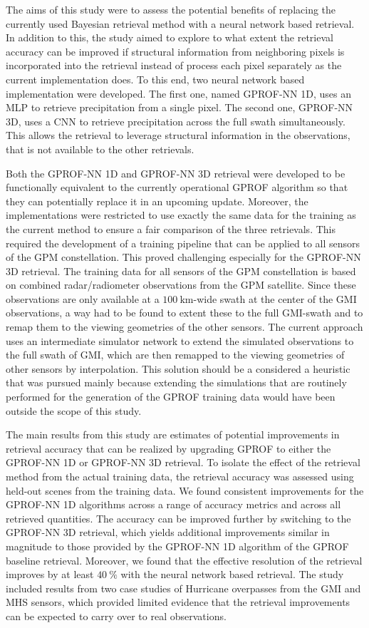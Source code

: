 The aims of this study were to assess the potential benefits of replacing the
currently used Bayesian retrieval method with a neural network based retrieval.
In addition to this, the study aimed to explore to what extent the retrieval
accuracy can be improved if structural information from neighboring pixels is
incorporated into the retrieval instead of process each pixel separately as the
current implementation does. To this end, two neural network based
implementation were developed. The first one, named GPROF-NN 1D, uses an MLP to
retrieve precipitation from a single pixel. The second one, GPROF-NN 3D, uses a
CNN to retrieve precipitation across the full swath simultaneously. This allows
the retrieval to leverage structural information in the observations, that is
not available to the other retrievals.

Both the GPROF-NN 1D and GPROF-NN 3D retrieval were developed to be functionally
equivalent to the currently operational GPROF algorithm so that they can
potentially replace it in an upcoming update. Moreover, the implementations were
restricted to use exactly the same data for the training as the current method
to ensure a fair comparison of the three retrievals. This required the development of
a training pipeline that can be applied to all sensors of the GPM constellation.
This proved challenging especially for the GPROF-NN 3D retrieval. The training
data for all sensors of the GPM constellation is based on combined
radar/radiometer observations from the GPM satellite. Since these observations
are only available at a $\SI{100}{\kilo \meter}$-wide swath at the center of the
GMI observations, a way had to be found to extent these to the full GMI-swath
and to remap them to the viewing geometries of the other sensors. The current
approach uses an intermediate simulator network to extend the simulated
observations to the full swath of GMI, which are then remapped to the viewing
geometries of other sensors by interpolation. This solution should be a
considered a heuristic that was pursued mainly because extending the simulations
that are routinely performed for the generation of the GPROF training data would
have been outside the scope of this study.

The main results from this study are estimates of potential improvements in
retrieval accuracy that can be realized by upgrading GPROF to either the
GPROF-NN 1D or GPROF-NN 3D retrieval. To isolate the effect of the retrieval
method from the actual training data, the retrieval accuracy was assessed using
held-out scenes from the training data. We found consistent improvements for the
GPROF-NN 1D algorithms across a range of accuracy metrics and across all
retrieved quantities. The accuracy can be improved further by switching to the
GPROF-NN 3D retrieval, which yields additional improvements similar in magnitude
to those provided by the GPROF-NN 1D algorithm of the GPROF baseline retrieval.
Moreover, we found that the effective resolution of the retrieval improves by at
least $\SI{40}{\percent}$ with the neural network based retrieval. The study
included results from two case studies of Hurricane overpasses from the GMI and
MHS sensors, which provided limited evidence that the retrieval improvements can
be expected to carry over to real observations.

